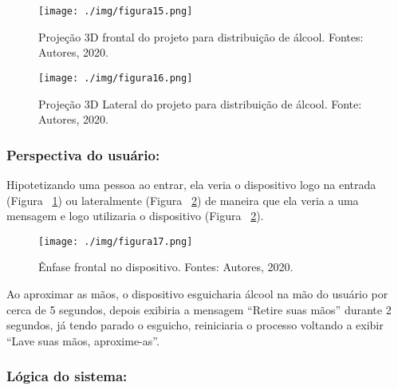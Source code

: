 \documentclass[10pt,twocolumn,letterpaper]{article}
\begin{document}
{
\begin{figure}[!h]
\begin{center}
   \texttt{[image: ./img/figura15.png]}
\end{center}
   \caption{ Projeção 3D frontal do projeto para distribuição de álcool. Fontes: Autores, 2020.}
\label{fig:figura15}
\end{figure}
}

{
\begin{figure}[!h]
\begin{center}
   \texttt{[image: ./img/figura16.png]}
\end{center}
   \caption{ Projeção 3D Lateral do projeto para distribuição de álcool. Fonte: Autores, 2020.}
\label{fig:figura16}
\end{figure}
}

\subsubsection{Perspectiva do usuário:}

Hipotetizando uma pessoa ao entrar, ela veria o dispositivo logo na entrada (Figura ~\ref{fig:figura15}) ou lateralmente (Figura ~\ref{fig:figura16}) de maneira que ela veria a uma mensagem e logo utilizaria o dispositivo (Figura ~\ref{fig:figura16}).

{
\begin{figure}[!h]
\begin{center}
   \texttt{[image: ./img/figura17.png]}
\end{center}
   \caption{ Ênfase frontal no dispositivo. Fontes: Autores, 2020.}
\label{fig:figura17}
\end{figure}
} 

Ao aproximar as mãos, o dispositivo esguicharia álcool na mão do usuário por cerca de 5 segundos, depois exibiria a mensagem “Retire suas mãos” durante 2 segundos, já tendo parado o esguicho, reiniciaria o processo voltando a exibir “Lave suas mãos, aproxime-as”.

\subsubsection{Lógica do sistema:}
\end{document}
